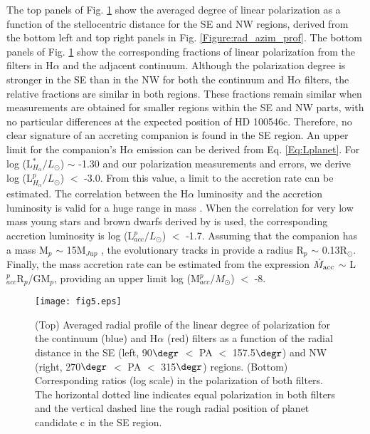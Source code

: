 \documentclass{aa}
\begin{document}
The top panels of Fig. \ref{Figure:rad_azim_prof_average} show the averaged degree of linear polarization as a function of the stellocentric distance for the SE and NW regions, derived from the bottom left and top right panels in Fig. \ref{Figure:rad_azim_prof}. The bottom panels of Fig. \ref{Figure:rad_azim_prof_average} show the corresponding fractions of linear polarization from the filters in H$\alpha$ and the adjacent continuum. Although the polarization degree is stronger in the SE than in the NW for both the continuum and H$\alpha$ filters, the relative fractions are similar in both regions. These fractions remain similar when measurements are obtained for smaller regions within the SE and NW parts, with no particular differences at the expected position of HD 100546c. Therefore, no clear signature of an accreting companion is found in the SE region. An upper limit for the companion's H$\alpha$ emission can be derived from Eq. \ref{Eq:Lplanet}. For log (L$_{H_{\alpha}}^*/L_{\odot}$) $\sim$ -1.30 \citep{Fairlamb17} and our polarization measurements and errors, we derive log (L$_{H_{\alpha}}^p/L_{\odot}$) $<$ -3.0. From this value, a limit to the accretion rate can be estimated. The correlation between the H$\alpha$ luminosity and the accretion luminosity is valid for a huge range in mass \citep{Mendi15a,Fairlamb17}. When the correlation for very low mass young stars and brown dwarfs derived by \citet{Herczeg08} is used, the corresponding accretion luminosity is log (L$_{acc}^p/L_{\odot}$) $<$ -1.7. Assuming that the companion has a mass M$_p$ $\sim$ 15M$_{Jup}$ \citep{Boccaletti13,Currie15}, the evolutionary tracks in \citet{Baraffe03} provide a radius R$_p$ $\sim$ 0.13R$_\odot$. Finally, the mass accretion rate can be estimated from the expression $\dot{M}_{\rm acc}$ $\sim$ L$_{acc}^p$R$_p$/GM$_p$, providing an upper limit log (M$_{acc}^p/M_{\odot}$) $<$ -8. 

\begin{figure}
\centering
 \texttt{[image: fig5.eps]}
\caption{(Top) Averaged radial profile of the linear degree of polarization for the continuum (blue) and H$\alpha$ (red) filters as a function of the radial distance in the SE (left, 90$\degr$ $<$ PA $<$ 157.5$\degr$) and NW (right, 270$\degr$ $<$ PA $<$ 315$\degr$) regions. (Bottom) Corresponding ratios (log scale) in the polarization of both filters. The horizontal dotted line indicates equal polarization in both filters and the vertical dashed line the rough radial position of planet candidate c in the SE region.} 
\label{Figure:rad_azim_prof_average}
\end{figure} 
\end{document}
